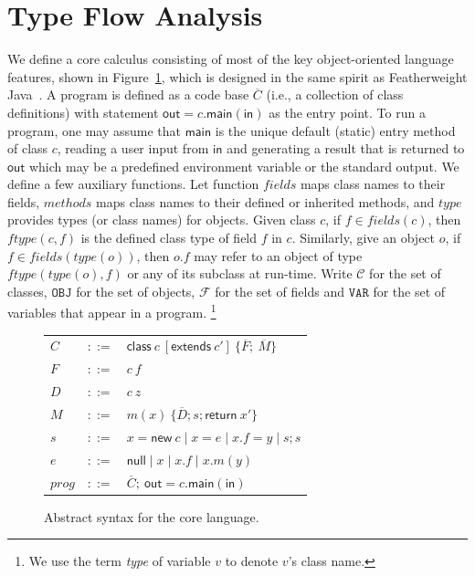 \documentclass{fac}
\newcommand{\keyword}[1]{\mathsf{#1}}
\newcommand{\kw}[1]{\keyword{#1}}
\newcommand{\kwnull}[0]{\keyword{null}}
\newcommand{\kwnew}[0]{\keyword{new}}
\newcommand{\kwextends}[0]{\keyword{extends}}
\newcommand{\kwclass}[0]{\keyword{class}}
\newcommand\Var{\mathtt{VAR}}
\newcommand\Val{\mathtt{V}}
\newcommand\Obj{\mathtt{OBJ}}
\newcommand{\Class}{\mathcal{C}}
\newcommand{\Field}{\mathcal{F}}
\newcommand\set[1]{\{#1\}}
\begin{document}
\section{Type Flow Analysis}\label{sec:type-flow-analysis}

We define a core calculus consisting of most of the key object-oriented language features, shown in Figure~\ref{fig:syntax}, which is designed in the same spirit as Featherweight Java~\cite{Igarashi2001}.
A program is defined as a code base $\overline{C}$ (i.e., a collection of class definitions) with statement $\keyword{out}=c.\keyword{main}(\keyword{in})$ as the entry point.
To run a program, one may assume that $\keyword{main}$ is the unique default (static) entry method of class $c$, reading a user input from $\keyword{in}$ and generating a result that is returned to $\keyword{out}$ which may be a predefined environment variable or the standard output.  %
We define a few auxiliary functions. Let function $fields$ maps class names to their fields, $methods$ maps class names to their defined or inherited methods, and $type$ provides types (or class names) for objects. Given class $c$, if $f\in fields(c)$, then $ftype(c,f)$ is the defined class type of field $f$ in $c$. Similarly, give an object $o$, if $f\in fields(type(o))$, then $o.f$ may refer to an object of type $ftype(type(o),f)$ or %
any of its subclass at run-time. Write $\Class$ for the set of classes, $\Obj$ for the set of objects, $\Field$ for the set of fields and $\Var$ for the set of variables that appear in a program.%
\footnote{We use the term \emph{type} of variable $v$ to denote $v$'s class name.}


\begin{figure}\centering
	\begin{tabular}[c]{lll}
		$C$&$::=$&$\kwclass\ c\ [\kwextends\ c'] \ \{\overline{F};\ \overline{M}\}$\\
        $F$&$::=$&$c \ f$\\
        $D$&$::=$&$c \ z$\\
		$M$&$::=$&$m(x) \ \{\overline{D}; s; \kw{return}\ x'\}$\\
		$s$&$::=$&$x{=}\kwnew \ c\mid  x {=} e \mid x.f{=}y \mid s;s$\\

		$e$&$::=$&$ \kwnull\mid x \mid x.f \mid x.m(y) $\\
        $prog$&$::=$&$\overline{C};\ \keyword{out}=c.\keyword{main}(\keyword{in})$\\
	\end{tabular}
	\caption{Abstract syntax for the core language. \label{fig:syntax}}
\end{figure}
\end{document}
